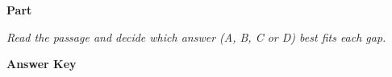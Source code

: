 \documentclass[../Exercise.tex]{subfiles}
\begin{document}
\begin{center}
	\large{\textbf{Part }}
\end{center} 

\vspace{5ex}

\noindent \textit{Read the passage and decide which answer (A, B, C or D) best fits each gap.}




\begin{framed}
\textbf{Answer Key}


\end{framed}

\vspace{7ex}
\end{document}
